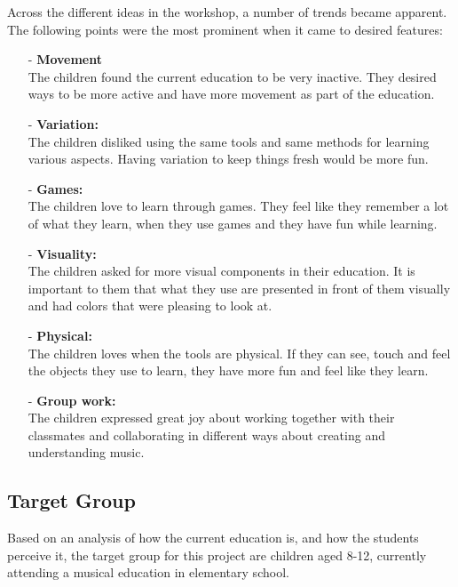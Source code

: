 Across the different ideas in the workshop, a number of trends became apparent. The following points were the most prominent when it came to desired features:\\

\newpage
\begin{itemize}
	\item[-] \textbf{Movement}\\
	The children found the current education to be very inactive. They desired ways to be more active and have more movement as part of the education.\\
	\item[-] \textbf{Variation:}\\
	The children disliked using the same tools and same methods for learning various aspects. Having variation to keep things fresh would be more fun.\\
	\item[-] \textbf{Games:}\\
	The children love to learn through games. They feel like they remember a lot of what they learn, when they use games and they have fun while learning. \\
	\item[-] \textbf{Visuality:}\\
	The children asked for more visual components in their education. It is important to them that what they use are presented in front of them visually and had colors that were pleasing to look at.\\
	\item[-] \textbf{Physical:}\\
	The children loves when the tools are physical. If they can see, touch and feel the objects they use to learn, they have more fun and feel like they learn.\\
	\item[-] \textbf{Group work:}\\
	The children expressed great joy about working together with their classmates and collaborating in different ways about creating and understanding music.\\
	
\end{itemize}



\subsection{Target Group} \label{sec:targetgroup} 
Based on an analysis of how the current education is, and how the students perceive it, the target group for this project are children aged 8-12, currently attending a musical education in elementary school.\\


